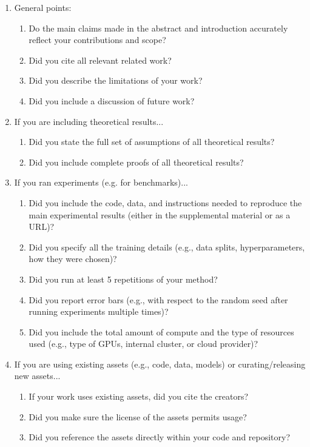 \documentclass{article}
\begin{document}
\begin{enumerate}

\item General points:
\begin{enumerate}
  \item Do the main claims made in the abstract and introduction accurately reflect your contributions and scope?
    \answerTODO{}
  \item Did you cite all relevant related work?
    \answerTODO{}
  \item Did you describe the limitations of your work?
    \answerTODO{}
  \item Did you include a discussion of future work?
    \answerTODO{}
\end{enumerate}

\item If you are including theoretical results...
\begin{enumerate}
  \item Did you state the full set of assumptions of all theoretical results?
    \answerTODO{}
	\item Did you include complete proofs of all theoretical results?
    \answerTODO{}
\end{enumerate}

\item If you ran experiments (e.g. for benchmarks)...
\begin{enumerate}
  \item Did you include the code, data, and instructions needed to reproduce the main experimental results (either in the supplemental material or as a URL)?
    \answerTODO{}
  \item Did you specify all the training details (e.g., data splits, hyperparameters, how they were chosen)?
    \answerTODO{}
  \item Did you run at least 5 repetitions of your method?
    \answerTODO{}
  \item Did you report error bars (e.g., with respect to the random seed after running experiments multiple times)?
    \answerTODO{}
  \item Did you include the total amount of compute and the type of resources used (e.g., type of GPUs, internal cluster, or cloud provider)?
    \answerTODO{}
\end{enumerate}

\item If you are using existing assets (e.g., code, data, models) or curating/releasing new assets...
\begin{enumerate}
  \item If your work uses existing assets, did you cite the creators?
    \answerTODO{}
  \item Did you make sure the license of the assets permits usage?
    \answerTODO{}
  \item Did you reference the assets directly within your code and repository?
    \answerTODO{}
\end{enumerate}
\end{enumerate}
\end{document}
